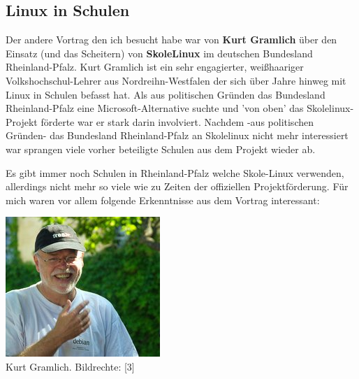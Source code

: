 \subsection*{Linux in Schulen}

Der andere Vortrag den ich besucht habe war von \textbf{Kurt Gramlich} über den Einsatz (und das Scheitern) von \textbf{SkoleLinux} im deutschen Bundesland Rheinland-Pfalz. Kurt Gramlich ist ein sehr engagierter, weißhaariger Volkshochschul-Lehrer aus Nordreihn-Westfalen der sich über Jahre hinweg mit Linux in Schulen befasst hat. Als aus politischen Gründen das Bundesland Rheinland-Pfalz eine Microsoft-Alternative suchte und 'von oben' das Skolelinux-Projekt förderte war er stark darin involviert. Nachdem -aus politischen Gründen- das Bundesland Rheinland-Pfalz an Skolelinux nicht mehr interessiert war sprangen viele vorher beteiligte Schulen aus dem Projekt wieder ab.

Es gibt immer noch Schulen in Rheinland-Pfalz welche Skole-Linux verwenden, allerdings nicht mehr so viele wie zu Zeiten der offiziellen Projektförderung. Für mich waren vor allem folgende Erkenntnisse aus dem Vortrag interessant:

\begin{center}
\includegraphics[width=\linewidth]{chemnitz-kurt.jpg} \\
\footnotesize{Kurt Gramlich. Bildrechte: [3]}
\end{center}

